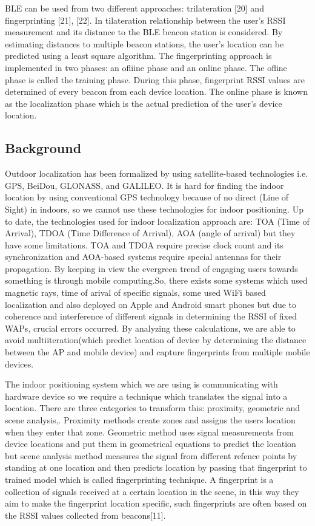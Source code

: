 BLE can be used from two different approaches: trilateration [20] and fingerprinting [21], [22]. In tilateration relationship between the user's RSSI measurement and its distance to the BLE beacon station is considered. By estimating distances to multiple beacon stations, the user's location can be predicted using a least square algorithm. The  fingerprinting approach is implemented in two phases: an ofliine phase and an online phase. The ofline phase is called the training phase. During this phase, fingerprint  RSSI values are determined of every beacon from each device location. The online phase is known as the localization phase which is the actual prediction of the user's device location.


\subsection{Background}
Outdoor localization has been formalized by using satellite-based technologies i.e. GPS\cite{GPS}, BeiDou\cite{cooper2016loco}, GLONASS\cite{cooper2016loco}, and GALILEO\cite{GALILEO}. It is hard for finding the indoor location by using conventional GPS technology because of no direct (Line of Sight)\cite{akram2018censloc} in indoors, so we cannot use these technologies for indoor positioning. Up to date, the technologies used for indoor localization approach are: TOA (Time of Arrival), TDOA (Time Difference of Arrival), AOA (angle of arrival) but they have some limitations. TOA and TDOA require precise clock count and its synchronization and AOA-based systems require special antennas for their propagation. 
By keeping in view the evergreen trend of engaging users towards something is through mobile computing.So, there exists some systems which used magnetic rays, time of arival of specific signals, some used WiFi based localization and also deployed on Apple and Android smart phones but due to coherence and interference of different signals in determining the RSSI of fixed WAPs, crucial errors occurred. By analyzing these calculations, we are able to avoid multiiteration(which predict location of device by determining the distance between the AP and mobile device) and capture fingerprints from multiple mobile devices.

The indoor positioning system which we are using is communicating with hardware device so we require a technique which translates the signal into a location. There are three categories to transform this: proximity, geometric and scene analysis,. Proximity methods create zones and assigns the users location when they enter that zone. Geometric method uses signal measurements from device locations and put them in geometrical equations to predict the location but scene analysis method measures the signal from different refence points by standing at one location and then predicts location by passing that fingerprint to trained model which is called fingerprinting technique. A fingerprint is
a collection of signals received at a certain location in the scene, in this way they aim to make the fingerprint
location specific, such fingerprints are often based on the RSSI values collected from beacons[11].

